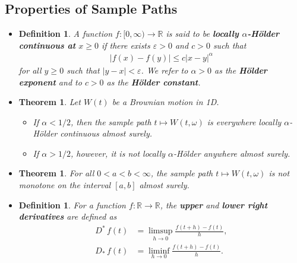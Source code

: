 \documentclass[10pt]{article}
\newtheorem{theorem}[lemma]{Theorem}
\newtheorem{definition}[lemma]{Definition}
\newcommand{\Real}{\mathbb{R}}
\begin{document}
\subsection{Properties of Sample Paths}

\begin{itemize}
  \item \begin{definition}
    A function $f: [0, \infty) \rightarrow \Real$ is said to be {\bf locally $\alpha$-H\"{o}lder continuous at} $x \geq 0$ if there exists $\varepsilon > 0$ and $c > 0$ such that
    \begin{align*}
      |f(x) - f(y)| \leq c |x-y|^\alpha
    \end{align*}
    for all $y \geq 0$ such that $|y - x| < \varepsilon$. We refer to $\alpha > 0$ as the {\bf H\"{o}lder exponent} and to $c > 0$ as the {\bf H\"{o}lder constant}.    
  \end{definition}

  \item \begin{theorem}
    Let $W(t)$ be a Brownian motion in 1D.
    \begin{itemize}
      \item If $\alpha < 1/2$, then the sample path $t \mapsto W(t,\omega)$ is everywhere locally $\alpha$-H\"{o}lder continuous almost surely.
      \item If $\alpha > 1/2$, however, it is not locally $\alpha$-H\"{o}lder anywhere almost surely.
    \end{itemize}     
  \end{theorem}

  \item \begin{theorem}
    For all $0 < a < b < \infty$, the sample path $t \mapsto W(t,\omega)$ is not monotone on the interval $[a,b]$ almost surely.
  \end{theorem}

  \item \begin{definition}
    For a function $f: \Real \rightarrow \Real$, the {\bf upper} and {\bf lower right derivatives} are defined as
    \begin{align*}
      D^*\,f(t) &= \limsup_{h\rightarrow 0} \frac{f(t+h)-f(t)}{h}, \\
      D_*\,f(t) &= \liminf_{h\rightarrow 0} \frac{f(t+h)-f(t)}{h}.
    \end{align*}
  \end{definition}


\end{itemize}
\end{document}
